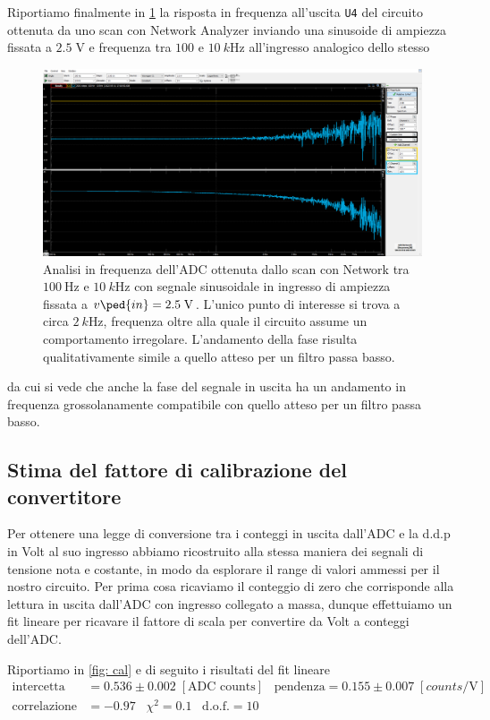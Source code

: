 \documentclass[10pt, a4paper, italian]{article}
\begin{document}
Riportiamo finalmente in \cref{fig: net} la risposta in frequenza all'uscita
\verb+U4+ del circuito ottenuta da uno scan con Network Analyzer inviando una
sinusoide di ampiezza fissata a $2.5 \; \si{\V}$ e frequenza tra $100$ e
$\SI{10}{k\Hz}$ all'ingresso analogico dello stesso
\begin{figure}[htbp]
	\centering
	\includegraphics[width=\textwidth]{Net100-10k}
	\caption{Analisi in frequenza dell'ADC ottenuta dallo scan con Network
	tra $\SI{100}{\Hz}$ e $\SI{10}{k\Hz}$ con segnale sinusoidale in ingresso
	di ampiezza fissata a $v\ped{in} = 2.5 \; \si{\V}$. L'unico punto di
	interesse si trova a circa $\SI{2}{k\Hz}$, frequenza oltre alla quale il
	circuito assume un comportamento irregolare. L'andamento della fase risulta
	qualitativamente simile a quello atteso per un filtro passa basso.
	\label{fig: net}}
\end{figure}
da cui si vede che anche la fase del segnale in uscita ha un andamento in
frequenza grossolanamente compatibile con quello atteso per un filtro passa
basso.

\subsection{Stima del fattore di calibrazione del convertitore}
Per ottenere una legge di conversione tra i conteggi in uscita dall'ADC e
la d.d.p in Volt al suo ingresso abbiamo ricostruito alla stessa maniera dei
segnali di tensione nota e costante, in modo da esplorare il range di valori
ammessi per il nostro circuito. Per prima cosa ricaviamo il conteggio di zero
che corrisponde alla lettura in uscita dall'ADC con ingresso collegato a massa,
dunque effettuiamo un fit lineare per ricavare il fattore di scala per
convertire da Volt a conteggi dell'ADC.

Riportiamo in \cref{fig: cal} e di seguito i risultati del fit lineare
\begin{align*}
\mathrm{intercetta} &= 0.536 \pm 0.002 \; [\text{ADC counts}] \;\;\;
\mathrm{pendenza} = 0.155 \pm 0.007 \; [\si{counts/\V}] \\
\mathrm{correlazione} &= -0.97 \;\;\; \chi^2 = 0.1 \;\;\; \text{d.o.f.} = 10
\end{align*}
\end{document}
